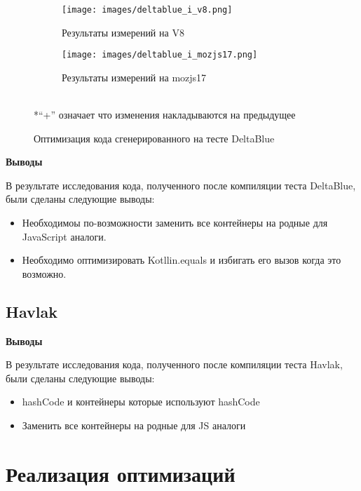
\begin{figure}[ht!]
\centering
	\begin{subfigure}[b]{0.7\textwidth}
	\centering
	\texttt{[image: images/deltablue\_i\_v8.png]}
	\caption{Результаты измерений на V8}
    \end{subfigure}

  	\begin{subfigure}[b]{0.7\textwidth}
	\centering
	\texttt{[image: images/deltablue\_i\_mozjs17.png]}
	\caption{Результаты измерений на mozjs17}
    \end{subfigure}
\\*``+'' означает что изменения накладываются на предыдущее
\caption{Оптимизация кода сгенерированного на тесте DeltaBlue}
\label{deltablue_i}
\end{figure}

\null
\begin{LARGE}
\begin{center}
\textbf{Выводы}
\end{center}
\end{LARGE}

В результате исследования кода, полученного после компиляции теста DeltaBlue, были сделаны следующие выводы:
\begin{itemize}
\item Необходимоы по-возможности заменить все контейнеры на родные для JavaScript аналоги.
\item Необходимо оптимизировать Kotllin.equals и избигать его вызов когда это возможно.
\end{itemize}



\subsection{Havlak}

\null
\begin{LARGE}
\begin{center}
\textbf{Выводы}
\end{center}
\end{LARGE}

В результате исследования кода, полученного после компиляции теста Havlak, были сделаны следующие выводы:

\begin{itemize}
\item hashCode
и контейнеры которые используют hashCode
\item Заменить все контейнеры на родные для JS аналоги
\end{itemize}
\section {Реализация оптимизаций}